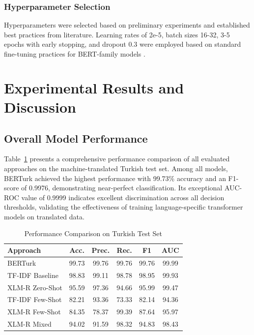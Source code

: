 \documentclass[conference]{IEEEtran}
\begin{document}
\subsubsection{Hyperparameter Selection}
Hyperparameters were selected based on preliminary experiments and established best practices from literature. Learning rates of 2e-5, batch sizes 16-32, 3-5 epochs with early stopping, and dropout 0.3 were employed based on standard fine-tuning practices for BERT-family models \cite{9}.

\section{Experimental Results and Discussion}

\subsection{Overall Model Performance}

Table~\ref{tab:results} presents a comprehensive performance comparison of all evaluated approaches on the machine-translated Turkish test set. Among all models, BERTurk achieved the highest performance with 99.73\% accuracy and an F1-score of 0.9976, demonstrating near-perfect classification. Its exceptional AUC-ROC value of 0.9999 indicates excellent discrimination across all decision thresholds, validating the effectiveness of training language-specific transformer models on translated data.

\begin{table}[htbp]
\centering
\caption{Performance Comparison on Turkish Test Set}
\label{tab:results}
\begin{tabular}{|l|c|c|c|c|c|}
\hline
\textbf{Approach} & \textbf{Acc.} & \textbf{Prec.} & \textbf{Rec.} & \textbf{F1} & \textbf{AUC} \\
\hline
BERTurk & 99.73 & 99.76 & 99.76 & 99.76 & 99.99 \\
TF-IDF Baseline & 98.83 & 99.11 & 98.78 & 98.95 & 99.93 \\
XLM-R Zero-Shot & 95.59 & 97.36 & 94.66 & 95.99 & 99.47 \\
TF-IDF Few-Shot & 82.21 & 93.36 & 73.33 & 82.14 & 94.36 \\
XLM-R Few-Shot & 84.35 & 78.37 & 99.39 & 87.64 & 95.97 \\
XLM-R Mixed & 94.02 & 91.59 & 98.32 & 94.83 & 98.43 \\
\hline
\end{tabular}
\end{table}
\end{document}
